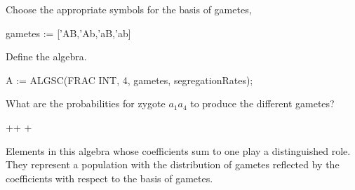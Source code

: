 {{{{{{{{{{{{{{{{{{\begin{xtc}
\begin{xtccomment}
Choose the appropriate symbols for the basis of gametes,
\end{xtccomment}
\begin{spadsrc}
gametes := ['AB,'Ab,'aB,'ab]  
\end{spadsrc}
\begin{TeXOutput}
\begin{fricasmath}{2}
%
\end{fricasmath}
\end{TeXOutput}
\end{xtc}
\begin{xtc}
\begin{xtccomment}
Define the algebra.
\end{xtccomment}
\begin{spadsrc}
A := ALGSC(FRAC INT, 4, gametes, segregationRates);
\end{spadsrc}
\end{xtc}

\begin{xtc}
\begin{xtccomment}
What are the probabilities for zygote
$a_1a_4$ to produce the different gametes?
\end{xtccomment}
\begin{TeXOutput}
\begin{fricasmath}{4}
\TIMES {}+\TIMES {}+%
\TIMES {}+\TIMES {}%
\end{fricasmath}
\end{TeXOutput}
\end{xtc}

Elements in this algebra whose coefficients sum to one play a
distinguished role.
They represent a population with the distribution of gametes
reflected by the coefficients with respect to the basis of
gametes.

}}}}}}}}}}}}}}}}}}
